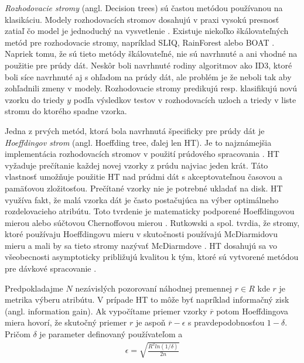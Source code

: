 \textit{Rozhodovacie stromy} (angl. Decision trees) sú častou metódou používanou na klasikáciu. Modely rozhodovacích stromov dosahujú v praxi vysokú presnosť zatiaľ čo model je jednoduchý na vysvetlenie \citep{jin2003efficient, hulten2001mining, domingos2000mining, aggarwal2014survey}. Existuje niekoľko škálovateľných metód pre rozhodovacie stromy, napríklad SLIQ, RainForest alebo BOAT \citep{aggarwal2014survey}. Napriek tomu, že sú tieto metódy škálovateľné, nie sú navrhnuté a ani vhodné na použitie pre prúdy dát. Neskôr boli navrhnuté rodiny algoritmov ako ID3, ktoré boli síce navrhnuté aj s ohľadom na prúdy dát, ale problém je že neboli tak aby  zohľadnili zmeny v modely. Rozhodovacie stromy predikujú resp. klasifikujú novú vzorku do triedy $y$ podľa výsledkov testov v rozhodovacích uzloch a triedy v liste stromu do ktorého spadne vzorka.
\par
Jedna z prvých metód, ktorá bola navrhnutá špecificky pre prúdy dát je \textit{Hoeffdingov strom} (angl. Hoeffding tree, ďalej len HT).  Je to najznámejšia implementácia rozhodovacích stromov v použití prúdového spracovania \citep{domingos2000mining, aggarwal2014survey, nguyen2015survey}. HT vyžaduje prečítanie každej novej vzorky z prúdu najviac jeden krát. Táto vlastnosť umožňuje použitie HT nad prúdmi dát s akceptovateľnou časovou a pamäťovou zložitosťou. Prečítané vzorky nie je potrebné ukladať na disk. HT využíva fakt, že malá vzorka dát je často postačujúca na výber optimálneho rozdelovacieho atribútu. Toto tvrdenie je matematicky podporené Hoeffdingovou mierou alebo súčtovou Chernoffovou mierou \citep{domingos2000mining, han2011data}. Rutkowski a spol. tvrdia, že stromy, ktoré používaju Hoeffdingovu mieru v skutočnosti používajú McDiarmidovu mieru a mali by sa tieto stromy nazývať McDiarmdove \citep{rutkowski2013decision}. HT dosahujú sa vo všeobecnosti asymptoticky približujú kvalitou k tým, ktoré sú vytvorené metódou pre dávkové spracovanie \citep{hall2009weka}.
\par
Predpokladajme $N$ nezávislých pozorovaní náhodnej premennej $r \in R$ kde $r$ je metrika výberu atribútu. V prípade HT to môže byť napríklad informačný zisk (angl. information gain). Ak vypočítame priemer vzorky $\overline{r}$ potom Hoeffdingova miera hovorí, že skutočný priemer $r$ je aspoň $\overline{r}-\epsilon$ s pravdepodobnosťou $1-\delta$. Pričom $\delta$ je parameter definovaný používateľom a 
\begin{align*}
\epsilon = \sqrt{ \frac{R^2ln(1/\delta)} {2n} }
\end{align*}
